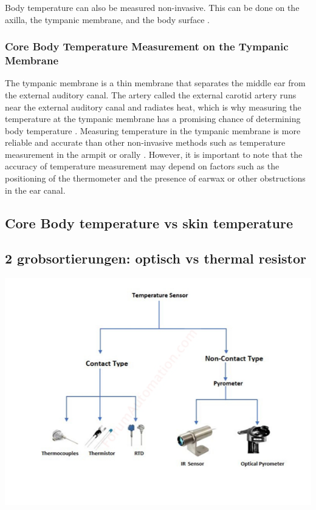 Body temperature can also be measured non-invasive.
This can be done on the axilla, the tympanic membrane, and the body surface \cite{moranCoreTemperatureMeasurement2002a}.

\subsubsection{Core Body Temperature Measurement on the Tympanic Membrane}
The tympanic membrane is a thin membrane that separates the middle ear from the external auditory canal. 
The artery called the external carotid artery runs near the external auditory canal and radiates heat, which is why measuring the temperature at the tympanic membrane has a promising chance of determining body temperature \cite{yeohRevisitingTympanicMembrane2017}.
Measuring temperature in the tympanic membrane is more reliable and accurate than other non-invasive methods such as temperature measurement in the armpit or orally \cite{ganioValidityReliabilityDevices2009, craigTemperatureMeasuredAxilla2000}. 
However, it is important to note that the accuracy of temperature measurement may depend on factors such as the positioning of the thermometer and the presence of earwax or other obstructions in the ear canal.



\subsection{Core Body temperature vs skin temperature}

\subsection{2 grobsortierungen: optisch vs thermal resistor}
\includegraphics[scale=0.7]{thesis-doc/images/introduction/temp_sensor_types.png}
